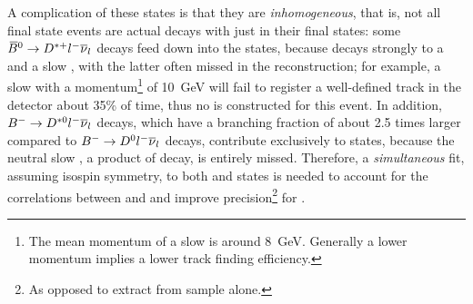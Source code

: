A complication of these states is that they are \emph{inhomogeneous},
that is, not all \Dz\mun final state events are actual decays with just \Dz\mun
in their final states:
some ${{\kern 0.18em\overline{\kern -0.18em B}}{}^0} \rightarrow {\ensuremath{{D}^{*+}}}{\ensuremath{l^-}}{\ensuremath{{\overline{\nu}}_l}}$ decays feed down into the \Dz\mun
states,
because \Dstarp decays strongly to a \Dz and a slow \pip,
with the latter often missed in the reconstruction;
for example, a slow \pip with a momentum\footnote{
    The mean momentum of a slow \pip is around 8~GeV.
    Generally a lower momentum implies a lower track finding efficiency.
} of 10~GeV will fail to register a
well-defined track in the detector about 35\% of time,
thus no \Dstarp is constructed for this event.
In addition, ${{{B}^-}} \rightarrow {\ensuremath{{D}^{*0}}}{\ensuremath{l^-}}{\ensuremath{{\overline{\nu}}_l}}$ decays,
which have a branching fraction of about 2.5 times larger compared to
${{{B}^-}} \rightarrow {\ensuremath{{D}^0}}{\ensuremath{l^-}}{\ensuremath{{\overline{\nu}}_l}}$ decays,
contribute exclusively to \Dz\mun states, because the neutral slow
\piz, a product of \Dstarz decay, is entirely missed.
Therefore, a \emph{simultaneous} fit,
assuming isospin symmetry,
to both \Dstarp\mun and \Dz\mun states is needed to
account for the correlations between \RD and \RDst and improve
precision\footnote{
    As opposed to extract \RDst from \Dstarp\mun sample alone.
} for \RDst.


